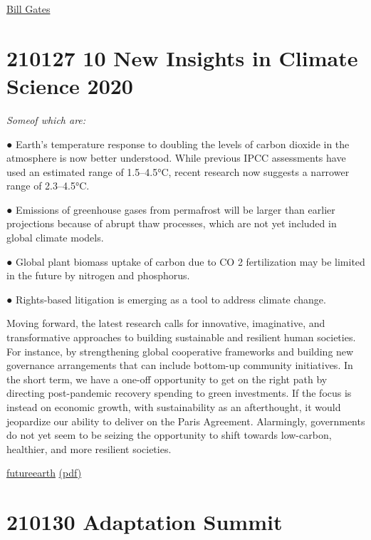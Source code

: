 \documentclass[
]{book}
\begin{document}
\href{https://www.theguardian.com/books/2021/feb/13/imperfect-messenger-bill-gates-on-what-needs-to-change-to-avoid-climate-disaster}{Bill Gates}

\hypertarget{new-insights-in-climate-science-2020}{%
\section{210127 10 New Insights in Climate Science 2020}\label{new-insights-in-climate-science-2020}}

\emph{Someof which are:}

● Earth's temperature response to doubling the levels of carbon dioxide in the
atmosphere is now better understood. While previous IPCC assessments have used
an estimated range of 1.5--4.5°C, recent research now suggests a narrower range of
2.3--4.5°C.

● Emissions of greenhouse gases from permafrost will be larger than earlier
projections because of abrupt thaw processes, which are not yet included in global
climate models.

● Global plant biomass uptake of carbon due to CO 2 fertilization may be limited in
the future by nitrogen and phosphorus.

● Rights-based litigation is emerging as a tool to address climate change.

Moving forward, the latest research calls for innovative, imaginative, and transformative
approaches to building sustainable and resilient human societies. For instance, by strengthening
global cooperative frameworks and building new governance arrangements that can include
bottom-up community initiatives. In the short term, we have a one-off opportunity to get on
the right path by directing post-pandemic recovery spending to green investments. If the focus
is instead on economic growth, with sustainability as an afterthought, it would jeopardize our
ability to deliver on the Paris Agreement. Alarmingly, governments do not yet seem to be seizing
the opportunity to shift towards low-carbon, healthier, and more resilient societies.

\href{https://10nics2020.futureearth.org/}{futureearth}
\href{pdf/10-new-insights-in-climate-science-2020.pdf}{(pdf)}

\hypertarget{adaptation-summit}{%
\section{210130 Adaptation Summit}\label{adaptation-summit}}
\end{document}
